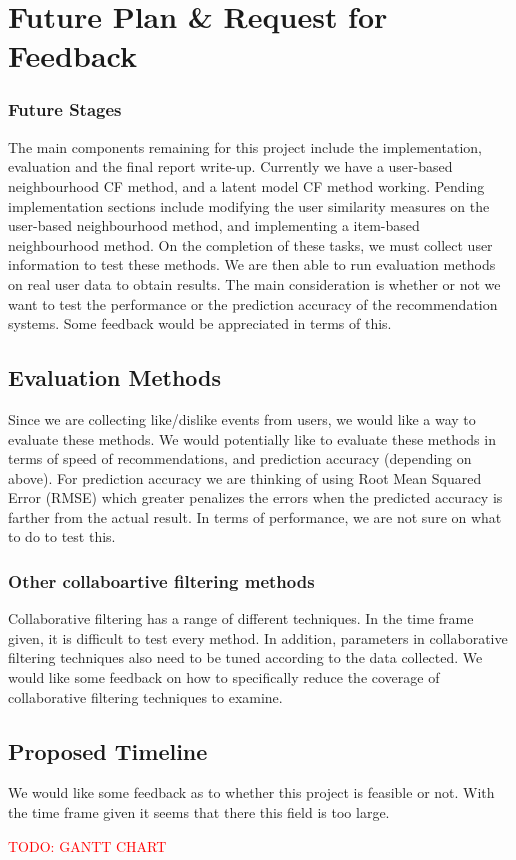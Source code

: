 \chapter{Future Plan \& Request for Feedback}\label{C:future}

\subsection{Future Stages}

The main components remaining for this project include the implementation, evaluation and the final report write-up. Currently we have a user-based neighbourhood CF method, and a latent model CF method working. Pending implementation sections include modifying the user similarity measures on the user-based neighbourhood method, and implementing a item-based neighbourhood method. On the completion of these tasks, we must collect user information to test these methods. We are then able to run evaluation methods on real user data to obtain results. The main consideration is whether or not we want to test the performance or the prediction accuracy of the recommendation systems. Some feedback would be appreciated in terms of this.

\section{Evaluation Methods}

Since we are collecting like/dislike events from users, we would like a way to evaluate these methods. We would potentially like to evaluate these methods in terms of speed of recommendations, and prediction accuracy (depending on above). For prediction accuracy we are thinking of using Root Mean Squared Error (RMSE) which greater penalizes the errors when the predicted accuracy is farther from the actual result. In terms of performance, we are not sure on what to do to test this. 

\subsection{Other collaboartive filtering methods}

Collaborative filtering has a range of different techniques. In the time frame given, it is difficult to test every method. In addition, parameters in collaborative filtering techniques also need to be tuned according to the data collected. We would like some feedback on how to specifically reduce the coverage of collaborative filtering techniques to examine. 

\section{Proposed Timeline}

We would like some feedback as to whether this project is feasible or not. With the time frame given it seems that there this field is too large. 


\textcolor{red}{TODO: GANTT CHART}



